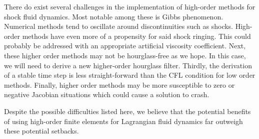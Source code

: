 \documentclass[a4paper,10pt]{article}
\begin{document}
There do exist several challenges in the implementation of high-order methods for shock fluid dynamics. Most notable among these is Gibbs phenomenon. Numerical methods tend to oscillate around discontinuities such as shocks. High-order methods have even more of a propensity for said shock ringing. This could probably be addressed with an appropriate artificial viscosity coefficient. Next, these higher order methods may not be hourglass-free as we hope. In this case, we will need to derive a new higher-order hourglass filter. Thirdly, the derivation of a stable time step is less straight-forward than the CFL condition for low order methods. Finally, higher order methods may be more susceptible to zero or negative Jacobian situations which could cause a solution to crash.

Despite the possible difficulties listed here, we believe that the potential benefits of using high-order finite elements for Lagrangian fluid dynamics far outweigh these potential setbacks. 
\end{document}
